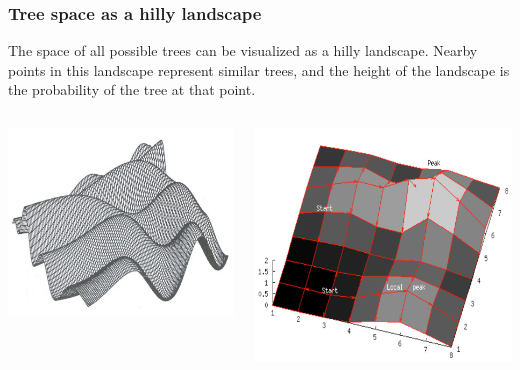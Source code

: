 \begin{frame}[plain]
\frametitle{Tree space as a hilly landscape}

\small{The space of all possible trees can be visualized as a hilly landscape. Nearby points in this landscape represent similar trees, and the height of the landscape is the probability of the tree at that point.}

\begin{columns}


\includegraphics[width=\textwidth]{../images/hillyLandscape1}


\includegraphics[width=\textwidth]{../images/hillyLandscape2}


\end{columns}
\end{frame}
